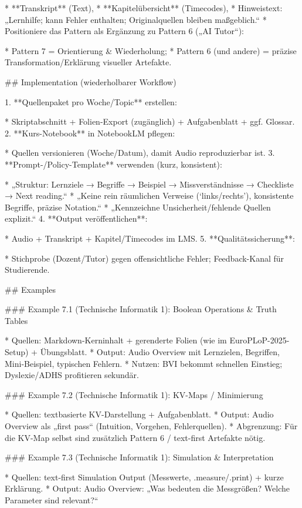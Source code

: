   * **Transkript** (Text),
  * **Kapitelübersicht** (Timecodes),
  * Hinweistext: „Lernhilfe; kann Fehler enthalten; Originalquellen bleiben maßgeblich.“
* Positioniere das Pattern als Ergänzung zu Pattern 6 („AI Tutor“):

  * Pattern 7 = Orientierung & Wiederholung;
  * Pattern 6 (und andere) = präzise Transformation/Erklärung visueller Artefakte.

## Implementation (wiederholbarer Workflow)

1. **Quellenpaket pro Woche/Topic** erstellen:

   * Skriptabschnitt + Folien-Export (zugänglich) + Aufgabenblatt + ggf. Glossar.
2. **Kurs-Notebook** in NotebookLM pflegen:

   * Quellen versionieren (Woche/Datum), damit Audio reproduzierbar ist.
3. **Prompt-/Policy-Template** verwenden (kurz, konsistent):

   * „Struktur: Lernziele → Begriffe → Beispiel → Missverständnisse → Checkliste → Next reading.“
   * „Keine rein räumlichen Verweise (‘links/rechts’), konsistente Begriffe, präzise Notation.“
   * „Kennzeichne Unsicherheit/fehlende Quellen explizit.“
4. **Output veröffentlichen**:

   * Audio + Transkript + Kapitel/Timecodes im LMS.
5. **Qualitätssicherung**:

   * Stichprobe (Dozent/Tutor) gegen offensichtliche Fehler; Feedback-Kanal für Studierende.

## Examples

### Example 7.1 (Technische Informatik 1): Boolean Operations & Truth Tables

* Quellen: Markdown-Kerninhalt + gerenderte Folien (wie im EuroPLoP-2025-Setup) + Übungsblatt.
* Output: Audio Overview mit Lernzielen, Begriffen, Mini-Beispiel, typischen Fehlern.
* Nutzen: BVI bekommt schnellen Einstieg; Dyslexie/ADHS profitieren sekundär.

### Example 7.2 (Technische Informatik 1): KV-Maps / Minimierung

* Quellen: textbasierte KV-Darstellung + Aufgabenblatt.
* Output: Audio Overview als „first pass“ (Intuition, Vorgehen, Fehlerquellen).
* Abgrenzung: Für die KV-Map selbst sind zusätzlich Pattern 6 / text-first Artefakte nötig.

### Example 7.3 (Technische Informatik 1): Simulation & Interpretation

* Quellen: text-first Simulation Output (Messwerte, .measure/.print) + kurze Erklärung.
* Output: Audio Overview: „Was bedeuten die Messgrößen? Welche Parameter sind relevant?“

